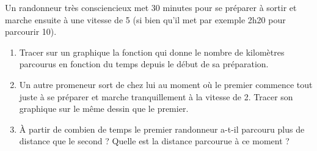 
\begin{exercice}\label{exosmath-0452}

    Un randonneur très consciencieux met \( 30\) minutes pour se préparer à sortir et marche ensuite à une vitesse de \unit{5}{\kilo\meter\per\hour} (si bien qu'il met par exemple 2h20 pour parcourir \unit{10}{\kilo\meter}).
    \begin{enumerate}
        \item
            Tracer sur un graphique la fonction qui donne le nombre de kilomètres parcourus en fonction du temps depuis le début de sa préparation.
        \item
            Un autre promeneur sort de chez lui au moment où le premier commence tout juste à se préparer et marche tranquillement à la vitesse de \unit{2}{\kilo\meter\per\hour}. Tracer son graphique sur le même dessin que le premier.
        \item
            À partir de combien de temps le premier randonneur a-t-il parcouru plus de distance que le second ? Quelle est la distance parcourue à ce moment ?
    \end{enumerate}

\end{exercice}
